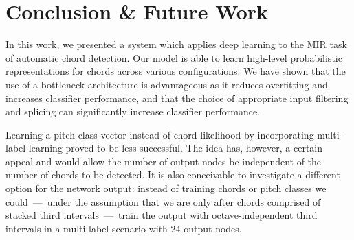 \documentclass{article}
\begin{document}
\section{Conclusion \& Future Work}
In this work, we presented a system which applies deep learning to the MIR task of automatic chord detection. Our model is able to learn high-level probabilistic representations for chords across various configurations. We have shown that 
the use of a bottleneck architecture is advantageous as it reduces overfitting and increases classifier performance, and that
the choice of appropriate input filtering and splicing can significantly increase classifier performance.

Learning a pitch class vector instead of chord likelihood by incorporating multi-label learning proved to be less successful. The idea has, however, a certain appeal and would allow the number of output nodes be independent of the number of chords to be detected. It is also conceivable to investigate a different option for the network output: instead of training chords or pitch classes we could~---~under the assumption that we are only after chords comprised of stacked third intervals~---~train the output with octave-independent third intervals in a multi-label scenario with $24$ output nodes.


\end{document}
